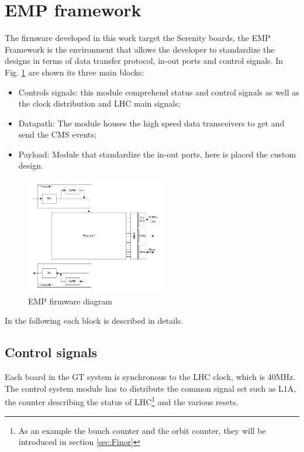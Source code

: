 \documentclass[../../main.tex]{subfiles}
\begin{document}
\clearpage
\section{EMP framework}
\label{EMP}

The firmware developed in this work target the Serenity boards, the EMP Framework \cite{EMP}  is the environment that allows the developer to standardize the designs in terms of data transfer protocol, in-out ports and control signals.  
In Fig. \ref{fig:EMP-fw} are shown its three main blocks:
\begin{itemize}
    \item Controls signals: this module comprehend status and control signals as well as the clock distribution and LHC main signals;
    \item Datapath: The module houses the high speed data transceivers to get and send the CMS events;
    \item Payload: Module that standardize the in-out ports, here is placed the custom design.
\end{itemize}

\begin{figure}[h]
    \centering
    \includegraphics[width=0.55\textwidth]{sections/05/Images/EMP-fwk.pdf}
    \caption{EMP firmware diagram}
    \label{fig:EMP-fw}
\end{figure}

In the following each block is described in details.

\subsection{Control signals}
\label{sec:EMP-control}

Each board in the GT system is synchronous to the LHC clock, which is 40MHz. The control system module has to distribute the common signal set such as L1A, the counter describing the status of LHC\footnote{As an example the bunch counter and the orbit counter, they will be introduced in section \ref{sec:Finor}} and the various resets.  
\end{document}
